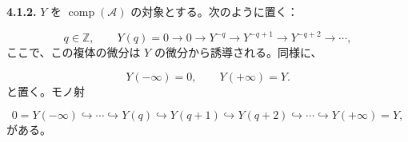 \medskip\noindent\textbf{4.1.2.}\quad
$Y$ を $\operatorname{comp}(\mathcal A)$ の対象とする。次のように置く：

\begin{equation}
q\in\mathbb Z,\qquad
Y(q)=0\longrightarrow0\longrightarrow Y^{-q}\longrightarrow
Y^{-q+1}\longrightarrow Y^{-q+2}\longrightarrow\cdots,
\tag{4.1.2.1}
\end{equation}
ここで、この複体の微分は $Y$ の微分から誘導される。同様に、

\begin{equation}
Y(-\infty)=0,\qquad Y(+\infty)=Y.
\tag{4.1.2.2}
\end{equation}
と置く。モノ射

\[
0=Y(-\infty)\hookrightarrow\cdots\hookrightarrow Y(q)
\hookrightarrow Y(q+1)\hookrightarrow Y(q+2)\hookrightarrow\cdots
\hookrightarrow Y(+\infty)=Y,
\]
がある。
\endgroup
